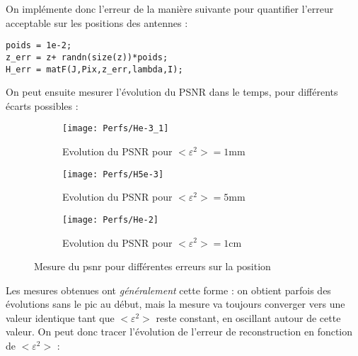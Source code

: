 \documentclass[titlepage]{article}
\begin{document}
	On implémente donc l'erreur de la manière suivante pour quantifier l'erreur acceptable sur les positions des antennes :
	
	\begin{verbatim}
poids = 1e-2;
z_err = z+ randn(size(z))*poids;
H_err = matF(J,Pix,z_err,lambda,I);
	\end{verbatim}

	On peut ensuite mesurer l'évolution du PSNR dans le temps, pour différents écarts possibles :
	
%	
%	
	
	\begin{figure}[H]
		\centering
		\begin{subfigure}{.5\textwidth}
			\centering
			\texttt{[image: Perfs/He-3\_1]}
			\caption{Evolution du PSNR pour $<\varepsilon^2>=1$mm}
			\label{fig:he-3}
		\end{subfigure}%
		\begin{subfigure}{.5\textwidth}
			\centering
			\texttt{[image: Perfs/H5e-3]}
			\caption{Evolution du PSNR pour $<\varepsilon^2>=5$mm}
			\label{fig:h5e-3}
		\end{subfigure}
		\begin{subfigure}{.5\textwidth}
			\centering
			\texttt{[image: Perfs/He-2]}
			\caption{Evolution du PSNR pour $<\varepsilon^2>=1$cm}
			\label{fig:he-2}
		\end{subfigure}
		\caption{Mesure du psnr pour différentes erreurs sur la position}
	\end{figure}

	Les mesures obtenues ont \emph{généralement} cette forme : on obtient parfois des évolutions sans le pic au début, mais la mesure va toujours converger vers une valeur identique tant que $<\varepsilon^2>$ reste constant, en oscillant autour de cette valeur. On peut donc tracer l'évolution de l'erreur de reconstruction en fonction de $<\varepsilon^2>$ :
	
\end{document}
